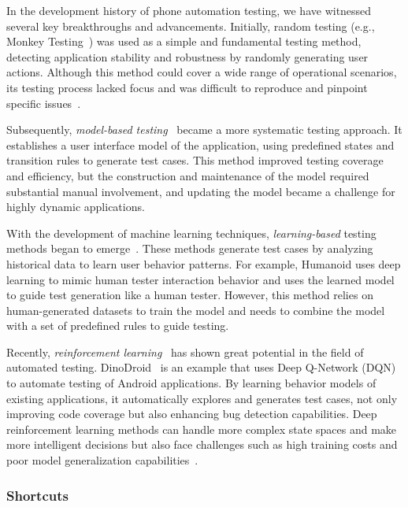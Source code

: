 In the development history of phone automation testing, we have witnessed several key breakthroughs and advancements. Initially, random testing (e.g., Monkey Testing~\cite{machiry2013dynodroid}) was used as a simple and fundamental testing method, detecting application stability and robustness by randomly generating user actions. Although this method could cover a wide range of operational scenarios, its testing process lacked focus and was difficult to reproduce and pinpoint specific issues~\cite{kong2018automated}.

Subsequently, \textit{model-based testing}~\cite{amalfitano2012using,amalfitano2014mobiguitar,azim2013targeted} became a more systematic testing approach. It establishes a user interface model of the application, using predefined states and transition rules to generate test cases. This method improved testing coverage and efficiency, but the construction and maintenance of the model required substantial manual involvement, and updating the model became a challenge for highly dynamic applications.

With the development of machine learning techniques, \textit{learning-based} testing methods began to emerge~\cite{koroglu2018qbe,pan2020reinforcement,li2019humanoid,degott2019learning}. These methods generate test cases by analyzing historical data to learn user behavior patterns. For example, Humanoid \cite{li2019humanoid} uses deep learning to mimic human tester interaction behavior and uses the learned model to guide test generation like a human tester. However, this method relies on human-generated datasets to train the model and needs to combine the model with a set of predefined rules to guide testing.

Recently, \textit{reinforcement learning}~\cite{ladosz2022exploration} has shown great potential in the field of automated testing. DinoDroid~\cite{zhao2024dinodroid} is an example that uses Deep Q-Network (DQN)~\cite{fan2020theoretical} to automate testing of Android applications. By learning behavior models of existing applications, it automatically explores and generates test cases, not only improving code coverage but also enhancing bug detection capabilities. Deep reinforcement learning methods can handle more complex state spaces and make more intelligent decisions but also face challenges such as high training costs and poor model generalization capabilities~\cite{luo2024survey}.

\subsubsection{Shortcuts}

